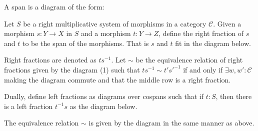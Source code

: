     \begin{definition}
        A span is a diagram of the form:
        \begin{center}
        \end{center}
    \end{definition}

    \begin{definition}
        Let $S$ be a right multiplicative system of morphisms in a category $\mathcal{C}$. Given a morphism $s : Y\rightarrow X$ in $S$ and a morphism $t:Y\rightarrow Z$, define the right fraction of $s$ and $t$ to be the span of the morphisms. That is $s$ and $t$ fit in the diagram below.
        \begin{center}
        \end{center}
        Right fractions are denoted as $ts^{-1}$.
        Let $\sim$ be the equivalence relation of right fractions given by the diagram (1) such that $ts^{-1}\sim t's'^{-1}$ if and only if $\exists w,w':\mathcal{C}$ making the diagram commute and that the middle row is a right fraction.
        \begin{center}
        \end{center}
    \end{definition}

    Dually, define left fractions as diagrams over cospans such that if $t:S$, then there is a left fraction $t^{-1}s$ as the diagram below.
    \begin{center}
    \end{center}

    The equivalence relation $\sim$ is given by the diagram in the same manner as above.
    \begin{center}
    \end{center}

